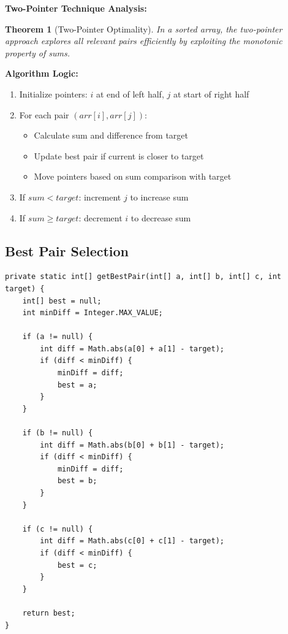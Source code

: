 \documentclass[12pt,a4paper]{article}
\newtheorem{theorem}{Theorem}
\begin{document}
\textbf{Two-Pointer Technique Analysis:}

\begin{theorem}[Two-Pointer Optimality]
In a sorted array, the two-pointer approach explores all relevant pairs efficiently by exploiting the monotonic property of sums.
\end{theorem}

\textbf{Algorithm Logic:}
\begin{enumerate}
    \item Initialize pointers: $i$ at end of left half, $j$ at start of right half
    \item For each pair $(arr[i], arr[j])$:
    \begin{itemize}
        \item Calculate sum and difference from target
        \item Update best pair if current is closer to target
        \item Move pointers based on sum comparison with target
    \end{itemize}
    \item If $sum < target$: increment $j$ to increase sum
    \item If $sum \geq target$: decrement $i$ to decrease sum
\end{enumerate}

\subsection{Best Pair Selection}

\begin{lstlisting}[caption=Selecting the Best Pair Among Candidates]
private static int[] getBestPair(int[] a, int[] b, int[] c, int target) {
    int[] best = null;
    int minDiff = Integer.MAX_VALUE;

    if (a != null) {
        int diff = Math.abs(a[0] + a[1] - target);
        if (diff < minDiff) {
            minDiff = diff;
            best = a;
        }
    }

    if (b != null) {
        int diff = Math.abs(b[0] + b[1] - target);
        if (diff < minDiff) {
            minDiff = diff;
            best = b;
        }
    }

    if (c != null) {
        int diff = Math.abs(c[0] + c[1] - target);
        if (diff < minDiff) {
            best = c;
        }
    }

    return best;
}
\end{lstlisting}
\end{document}
